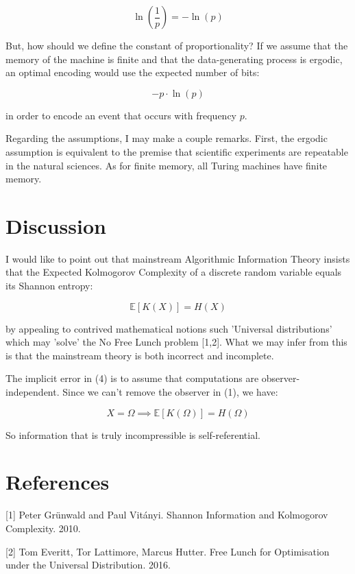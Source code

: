 \documentclass{article}
\begin{document}
\begin{equation}
\ln(\frac{1}{p}) = - \ln(p)
\end{equation}

But, how should we define the constant of proportionality? If we assume that the memory of the machine is finite and that
the data-generating process is ergodic, an optimal encoding would use the expected number of bits:

\begin{equation}
-p \cdot \ln(p)
\end{equation}

in order to encode an event that occurs with frequency $p$.

Regarding the assumptions, I may make a couple remarks. First, the ergodic assumption is equivalent to the premise that
scientific experiments are repeatable in the natural sciences. As for finite memory, all Turing machines have finite
memory.

\newpage 

\section{Discussion}

I would like to point out that mainstream Algorithmic Information Theory insists that the Expected Kolmogorov Complexity
of a discrete random variable equals its Shannon entropy:

\begin{equation}
\mathbb{E}[K(X)] = H(X)
\end{equation}

by appealing to contrived mathematical notions such 'Universal distributions' which may 'solve' the No Free Lunch problem [1,2]. What we may infer from this is that the mainstream theory is both incorrect and incomplete. 

The implicit error in (4) is to assume that computations are observer-independent. Since we can't remove the observer in (1),
we have:

\begin{equation}
X = \Omega \implies \mathbb{E}[K(\Omega)] = H(\Omega)
\end{equation}

So information that is truly incompressible is self-referential.


\section*{References}

\small
[1] Peter Grünwald and Paul Vitányi. Shannon Information and Kolmogorov Complexity. 2010.

[2] Tom Everitt, Tor Lattimore, Marcus Hutter. Free Lunch for Optimisation under the Universal Distribution. 2016.
\end{document}
